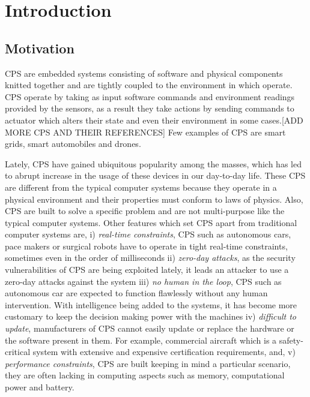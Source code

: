 
\chapter{Introduction}
\label{ch:Introduction}

\section{Motivation}
\label{sec:Motivation}

\ac{CPS} are embedded systems consisting of software and physical components knitted together and are tightly coupled to the environment in which operate. \ac{CPS} operate by taking as input software commands and environment readings provided by the sensors, as a result they take actions by sending commands to actuator which alters their state and even their environment in some cases.[ADD MORE CPS AND THEIR REFERENCES] Few examples of \ac{CPS} are smart grids, smart automobiles and drones.

Lately, CPS have gained ubiquitous popularity among the masses, which has led to abrupt increase in the usage of these devices in our day-to-day life. These \ac{CPS} are different from the typical computer systems because they operate in a physical environment and their properties must conform to laws of physics. Also, \ac{CPS} are built to solve a specific problem and are not multi-purpose like the typical computer systems. Other features which set \ac{CPS} apart from traditional computer systems are, i) \textit{real-time constraints}, \ac{CPS} such as autonomous cars, pace makers or surgical robots have to operate in tight real-time constraints, sometimes even in the order of milliseconds ii) \textit{zero-day attacks}, as the security vulnerabilities of \ac{CPS} are being exploited lately, it leads an attacker to use a zero-day attacks against the system iii) \textit{no human in the loop}, \ac{CPS} such as autonomous car are expected to function flawlessly without any human intervention. With intelligence being added to the systems, it has become more customary to keep the decision making power with the machines  iv) \textit{difficult to update}, manufacturers of \ac{CPS} cannot easily update or replace the hardware or the software present in them. For example, commercial aircraft which is a safety-critical system with extensive and expensive certification requirements, and, v) \textit{performance constraints}, \ac{CPS} are built keeping in mind a particular scenario, they are often lacking in computing aspects such as memory, computational power and battery.


